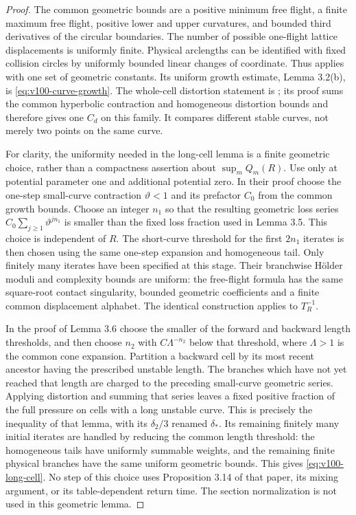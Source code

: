 \begin{proof}
The common geometric bounds are a positive minimum free flight,
a finite maximum free flight, positive lower and upper curvatures,
and bounded third derivatives of the circular boundaries. The
number of possible one-flight lattice displacements is uniformly
finite. Physical arclengths can be identified with fixed collision
circles by uniformly bounded linear changes of coordinate. Thus
\cite[Theorem 2.5 and Remark 2.7]{DZUniform} applies with one set of
geometric constants. Its uniform growth estimate, Lemma 3.2(b), is
\eqref{eq:v100-curve-growth}. The whole-cell distortion statement is
\cite[Lemma 2.2]{BDPressure}; its proof sums the common hyperbolic
contraction and homogeneous distortion bounds and therefore gives
one $C_d$ on this family. It compares different stable curves, not
merely two points on the same curve.

For clarity, the uniformity needed in the long-cell lemma is a
finite geometric choice, rather than a compactness assertion about
$\sup_m Q_m(R)$. Use \cite[Lemmas 3.3, 3.5 and 3.6]{BDPressure}
only at potential parameter one and additional potential zero.
In their proof choose the one-step small-curve contraction
$\vartheta<1$ and its prefactor $C_0$ from the common growth bounds.
Choose an integer $n_1$ so that the resulting geometric loss series
$C_0\sum_{j\ge1}\vartheta^{jn_1}$ is smaller than the fixed loss
fraction used in Lemma 3.5. This choice is independent of $R$.
The short-curve threshold for the first $2n_1$ iterates is then chosen
using the same one-step expansion and homogeneous tail. Only finitely
many iterates have been specified at this stage. Their branchwise
H\"older moduli and complexity bounds are uniform: the free-flight
formula has the same square-root contact singularity, bounded
geometric coefficients and a finite common displacement alphabet.
The identical construction applies to $T_R^{-1}$.

In the proof of Lemma 3.6 choose the smaller of the forward and
backward length thresholds, and then choose $n_2$ with
$C\Lambda^{-n_2}$ below that threshold, where $\Lambda>1$ is the
common cone expansion. Partition a backward cell by its most recent
ancestor having the prescribed unstable length. The branches which
have not yet reached that length are charged to the preceding
small-curve geometric series. Applying distortion and summing that
series leaves a fixed positive fraction of the full pressure on
cells with a long unstable curve. This is precisely the inequality
of that lemma, with its $\delta_2/3$ renamed $\delta_*$. Its remaining
finitely many initial iterates are handled by reducing the common
length threshold: the homogeneous tails have uniformly summable
weights, and the remaining finite physical branches have the same
uniform geometric bounds. This gives \eqref{eq:v100-long-cell}.
No step of this choice uses Proposition 3.14 of that paper, its
mixing argument, or its table-dependent return time. The section normalization is not used in this geometric lemma.
\end{proof}

